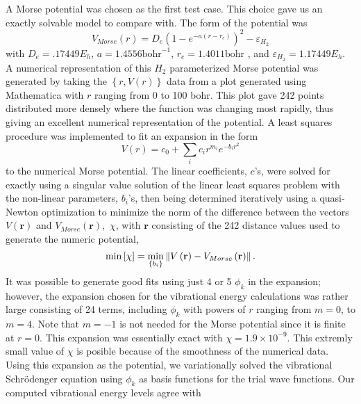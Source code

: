 \documentclass[12pt,thmsa]{article}
\begin{document}
A Morse potential was chosen as the first test case. This choice gave us an
exactly solvable model to compare with. The form of the potential was 
\begin{equation}
V_{Morse}\left( r\right) =D_e\left( 1-e^{-a\left( r-r_e\right) }\right)
^2-\varepsilon _{H_2}
\end{equation}
with $D_e=.17449E_h$, $a=1.4556\mathrm{bohr}^{-1}$, $r_e=1.4011\mathrm{bohr}$%
, and $\varepsilon _{H_2}=1.17449E_h.$ A numerical representation of this $%
H_2$ parameterized Morse potential was generated by taking the $\left\{
r,V\left( r\right) \right\} $ data from a plot generated using Mathematica%
\cite{Mathematica} with $r$ ranging from 0 to 100 bohr. This plot gave 242
points distributed more densely where the function was changing most
rapidly, thus giving an excellent numerical representation of the potential.
A least squares procedure was implemented to fit an expansion in the form 
\begin{equation}
V\left( r\right) =c_0+\sum_ic_ir^{m_i}e^{-b_ir^2}
\end{equation}
to the numerical Morse potential. The linear coefficients, $c$'s, were
solved for exactly using a singular value solution of the linear least
squares problem with the non-linear parameters, $b_i$'s, then being
determined iteratively using a quasi-Newton optimization to minimize the
norm of the difference between the vectors $V\left( \mathbf{r}\right) $ and $%
V_{Morse}\left( \mathbf{r}\right) ,$ $\chi $, with $\mathbf{r}$ consisting
of the 242 distance values used to generate the numeric potential, 
\begin{equation}
\min \left[ \chi \right] =\min_{\left\{ b_i\right\} }\left\| V\left( \mathbf{%
r}\right) -V_{Morse}\left( \mathbf{r}\right) \right\| .
\end{equation}
It was possible to generate good fits using just 4 or 5 $\phi _k$ in the
expansion; however, the expansion chosen for the vibrational energy
calculations was rather large consisting of 24 terms, including $\phi _k$
with powers of $r$ ranging from $m=0$, to $m=4$. Note that $m=-1$ is not
needed for the Morse potential since it is finite at $r=0$. This expansion
was essentially exact with $\chi =1.9\times 10^{-9}$. This extremly small
value of $\chi $ is posible because of the smoothness of the numerical data.
Using this expansion as the potential, we variationally solved the
vibrational Schr\"{o}denger equation using $\phi _k$ as basis functions for
the trial wave functions. Our computed vibrational energy levels agree with
\end{document}
